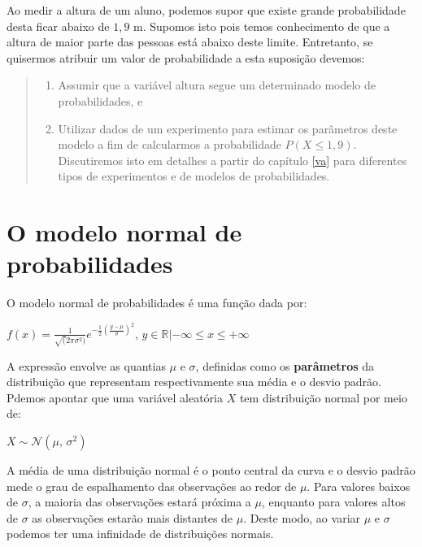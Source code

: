 \documentclass[
]{book}
\providecommand{\tightlist}{%
  \setlength{\itemsep}{0pt}\setlength{\parskip}{0pt}}
\begin{document}
Ao medir a altura de um aluno, podemos supor que existe grande probabilidade desta ficar abaixo de \(1,9\) m. Supomos isto pois temos conhecimento de que a altura de maior parte das pessoas está abaixo deste limite. Entretanto, se quisermos atribuir um valor de probabilidade a esta suposição devemos:

\begin{quote}
\begin{enumerate}
\def\labelenumi{\arabic{enumi}.}
\tightlist
\item
  Assumir que a variável altura segue um determinado modelo de probabilidades, e
\item
  Utilizar dados de um experimento para estimar os parâmetros deste modelo a fim de calcularmos a probabilidade \(P(X \le 1,9)\). Discutiremos isto em detalhes a partir do capítulo \ref{va} para diferentes tipos de experimentos e de modelos de probabilidades.
\end{enumerate}
\end{quote}

\hypertarget{o-modelo-normal-de-probabilidades}{%
\section{O modelo normal de probabilidades}\label{o-modelo-normal-de-probabilidades}}

O modelo normal de probabilidades é uma função dada por:

\(f(x) = \frac{1}{\sqrt(2\pi\sigma^2)}e^{-\frac{1}{2}(\frac{y-\mu}{\sigma})^2}\), \(y \in \mathbb{R} | -\infty \le x \le +\infty\)

A expressão envolve as quantias \(\mu\) e \(\sigma\), definidas como os \textbf{parâmetros} da distribuição que representam respectivamente sua média e o desvio padrão. Pdemos apontar que uma variável aleatória \(X\) tem distribuição normal por meio de:

\(X \sim \mathcal{N}(\mu,\,\sigma^2)\)

A média de uma distribuição normal é o ponto central da curva e o desvio padrão mede o grau de espalhamento das observações ao redor de \(\mu\). Para valores baixos de \(\sigma\), a maioria das observações estará próxima a \(\mu\), enquanto para valores altos de \(\sigma\) as observações estarão mais distantes de \(\mu\). Deste modo, ao variar \(\mu\) e \(\sigma\) podemos ter uma infinidade de distribuições normais.
\end{document}

